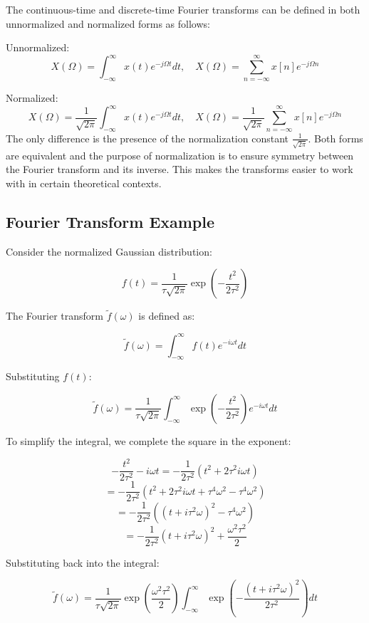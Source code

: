 \documentclass[12pt]{article}
\begin{document}
The continuous-time and discrete-time Fourier transforms can be defined in both unnormalized and normalized forms as follows:

Unnormalized:
\[
X(\Omega) = \int_{-\infty}^{\infty} x(t) e^{-j \Omega t} dt, \quad X(\Omega) = \sum_{n=-\infty}^{\infty} x[n] e^{-j \Omega n}
\]

Normalized:
\[
X(\Omega) = \frac{1}{\sqrt{2\pi}} \int_{-\infty}^{\infty} x(t) e^{-j \Omega t} dt, \quad X(\Omega) = \frac{1}{\sqrt{2\pi}} \sum_{n=-\infty}^{\infty} x[n] e^{-j \Omega n}
\]
The only difference is the presence of the normalization constant \(\frac{1}{\sqrt{2\pi}}\). Both forms are equivalent and the purpose of normalization is to ensure symmetry between the Fourier transform and its inverse. This makes the transforms easier to work with in certain theoretical contexts.

\subsection{Fourier Transform Example}

Consider the normalized Gaussian distribution:

\[ f(t) = \frac{1}{\tau \sqrt{2\pi}} \exp \left( - \frac{t^2}{2\tau^2} \right) \]

The Fourier transform \( \tilde{f}(\omega) \) is defined as:

\[ \tilde{f}(\omega) = \int_{-\infty}^{\infty} f(t) e^{-i \omega t} dt \]

Substituting \( f(t) \):

\[ \tilde{f}(\omega) = \frac{1}{\tau \sqrt{2\pi}} \int_{-\infty}^{\infty} \exp \left( - \frac{t^2}{2\tau^2} \right) e^{-i \omega t} dt \]

To simplify the integral, we complete the square in the exponent:

\[ - \frac{t^2}{2\tau^2} - i \omega t = -\frac{1}{2\tau^2} \left( t^2 + 2\tau^2 i \omega t \right) \]
\[ = -\frac{1}{2\tau^2} \left( t^2 + 2\tau^2 i \omega t + \tau^4 \omega^2 - \tau^4 \omega^2 \right) \]
\[ = -\frac{1}{2\tau^2} \left( (t + i\tau^2 \omega)^2 - \tau^4 \omega^2 \right) \]
\[ = -\frac{1}{2\tau^2} (t + i\tau^2 \omega)^2 + \frac{\omega^2 \tau^2}{2} \]

Substituting back into the integral:

\[ \tilde{f}(\omega) = \frac{1}{\tau \sqrt{2\pi}} \exp \left( \frac{\omega^2 \tau^2}{2} \right) \int_{-\infty}^{\infty} \exp \left( -\frac{(t + i\tau^2 \omega)^2}{2\tau^2} \right) dt \]
\end{document}
